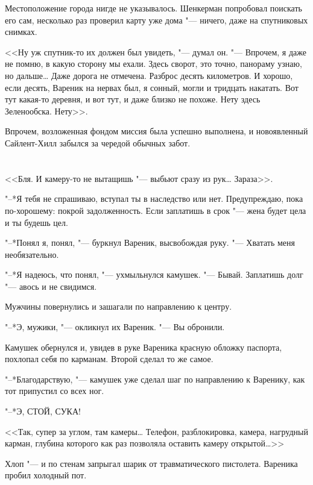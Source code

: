 Местоположение города нигде не указывалось.
Шенкерман попробовал поискать его сам, несколько раз проверил карту уже дома "--- ничего, даже на спутниковых снимках.

<<Ну уж спутник-то их должен был увидеть, "--- думал он.
"--- Впрочем, я даже не помню, в какую сторону мы ехали.
Здесь сворот, это точно, панораму узнаю, но дальше\dots{}
Даже дорога не отмечена.
Разброс десять километров.
И хорошо, если десять, Вареник на нервах был, я сонный, могли и тридцать накатать.
Вот тут какая-то деревня, и вот тут, и даже близко не похоже.
Нету здесь Зеленообска.
Нету>>.

Впрочем, возложенная фондом миссия была успешно выполнена, и новоявленный Сайлент-Хилл забылся за чередой обычных забот.

\chapter{}

\textspace

\label{Mon_2012_06_04}

<<Бля.
И камеру-то не вытащишь "--- выбьют сразу из рук\dots{}
Зараза>>.

"--*Я тебя не спрашиваю, вступал ты в наследство или нет.
Предупреждаю, пока по-хорошему: покрой задолженность.
Если заплатишь в срок "--- жена будет цела и ты будешь цел.

"--*Понял я, понял, "--- буркнул Вареник, высвобождая руку.
"--- Хватать меня необязательно.

"--*Я надеюсь, что понял, "--- ухмыльнулся камушек.
"--- Бывай.
Заплатишь долг "--- авось и не свидимся.

Мужчины повернулись и зашагали по направлению к центру.

"--*Э, мужики, "--- окликнул их Вареник.
"--- Вы обронили.

Камушек обернулся и, увидев в руке Вареника красную обложку паспорта, похлопал себя по карманам.
Второй сделал то же самое.

"--*Благодарствую, "--- камушек уже сделал шаг по направлению к Варенику, как тот припустил со всех ног.

"--*Э, СТОЙ, СУКА!

<<Так, супер за углом, там камеры\dots{}
Телефон, разблокировка, камера, нагрудный карман, глубина которого как раз позволяла оставить камеру открытой\dots>>

Хлоп "--- и по стенам запрыгал шарик от травматического пистолета.
Вареника пробил холодный пот.


